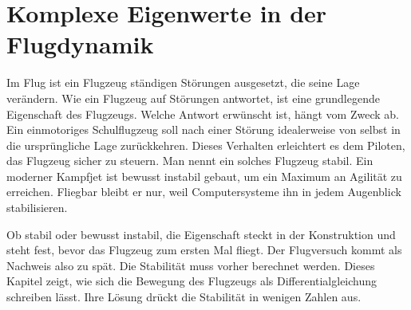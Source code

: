 %
%
%
%
\chapter{Komplexe Eigenwerte in der Flugdynamik\label{chapter:aircraft}}
\begin{refsection}
%
%

\noindent
Im Flug ist ein Flugzeug ständigen Störungen ausgesetzt, die seine
Lage verändern.
%
Wie ein Flugzeug auf Störungen antwortet, ist eine grundlegende
Eigenschaft des Flugzeugs.
Welche Antwort erwünscht ist, hängt vom Zweck ab.
Ein einmotoriges Schulflugzeug soll nach einer Störung idealerweise von selbst
%
in die ursprüngliche Lage zurückkehren.
Dieses Verhalten erleichtert es dem Piloten, das Flugzeug sicher zu
steuern.
Man nennt ein solches Flugzeug stabil.
Ein moderner Kampfjet ist bewusst instabil gebaut, um ein
Maximum an Agilität zu erreichen.
%
Fliegbar bleibt er nur, weil Computersysteme ihn in jedem Augenblick
stabilisieren.

Ob stabil oder bewusst instabil, die Eigenschaft steckt in der
Konstruktion und steht fest, bevor das Flugzeug zum ersten Mal
fliegt.
Der Flugversuch kommt als Nachweis also zu spät.
Die Stabilität muss vorher berechnet werden.
Dieses Kapitel zeigt, wie sich die Bewegung des Flugzeugs als
Differentialgleichung schreiben lässt.
Ihre Lösung drückt die Stabilität in wenigen Zahlen aus.
%














\printbibliography[heading=subbibliography]
\end{refsection}
